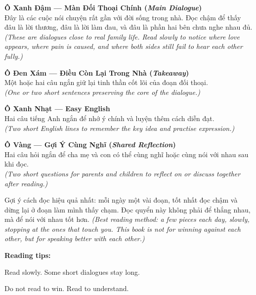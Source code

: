 \begin{tcolorbox}[
  colback=clayrose!8,
  colframe=clayrose!70!black,
  coltitle=black,
  fonttitle=\bfseries,
  title={Giải Thích Các Ô Trong Sách \quad\textit{\small(Book Guide)}},
  arc=4pt, boxrule=1pt, breakable, enhanced
]

\smallskip
\textbf{Ô Xanh Đậm --- Màn Đối Thoại Chính (\textit{Main Dialogue})}\\
Đây là các cuộc nói chuyện rất gần với đời sống trong nhà. Đọc chậm để thấy đâu là lời thương, đâu là lời làm đau, và đâu là phần hai bên chưa nghe nhau đủ.\\
\textit{(These are dialogues close to real family life. Read slowly to notice where love appears, where pain is caused, and where both sides still fail to hear each other fully.)}

\medskip
\textbf{Ô Đen Xám --- Điều Còn Lại Trong Nhà (\textit{Takeaway})}\\
Một hoặc hai câu ngắn giữ lại tinh thần cốt lõi của đoạn đối thoại.\\
\textit{(One or two short sentences preserving the core of the dialogue.)}

\medskip
\textbf{Ô Xanh Nhạt --- Easy English}\\
Hai câu tiếng Anh ngắn để nhớ ý chính và luyện thêm cách diễn đạt.\\
\textit{(Two short English lines to remember the key idea and practise expression.)}

\medskip
\textbf{Ô Vàng --- Gợi Ý Cùng Nghĩ (\textit{Shared Reflection})}\\
Hai câu hỏi ngắn để cha mẹ và con có thể cùng nghĩ hoặc cùng nói với nhau sau khi đọc.\\
\textit{(Two short questions for parents and children to reflect on or discuss together after reading.)}

\smallskip
\end{tcolorbox}

\vspace{6pt}

\begin{baihoc}
Gợi ý cách đọc hiệu quả nhất: mỗi ngày một vài đoạn, tốt nhất đọc chậm và dừng lại ở đoạn làm mình thấy chạm. Đọc quyển này không phải để thắng nhau, mà để nói với nhau tốt hơn.
\textit{(Best reading method: a few pieces each day, slowly, stopping at the ones that touch you. This book is not for winning against each other, but for speaking better with each other.)}
\end{baihoc}

\begin{ghinhoanh}
\textbf{Reading tips:}

Read slowly. Some short dialogues stay long.

Do not read to win. Read to understand.
\end{ghinhoanh}

\ngancach